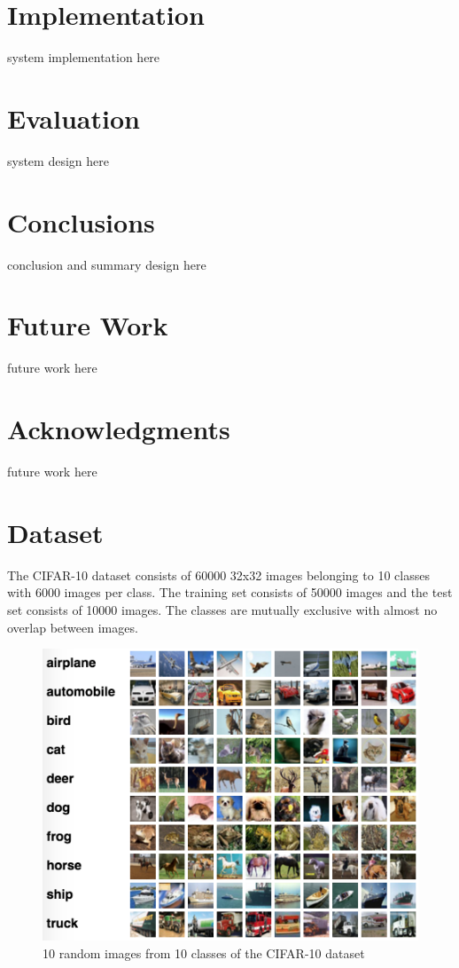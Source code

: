 \documentclass[10pt,twocolumn,letterpaper]{article}
\begin{document}
\section{Implementation} \label{implementation}
system implementation here

\section{Evaluation} \label{evaluation}
system design here

\section{Conclusions} \label{conclusions}
conclusion and summary design here

\section{Future Work} \label{futurework}
future work here

\section{Acknowledgments} \label{acknowledgments}
future work here

\section{Dataset}
The CIFAR-10 dataset \cite{krizhevsky2009learning} consists of 60000 32x32 images belonging to 10 classes with 6000 images per class.	The training set consists of 50000 images and the test set consists of 10000 images. The classes are mutually exclusive with almost no overlap between images.

\begin{figure}[hbt]
  \includegraphics[scale=0.50]{cifar-dataset}
  \caption{10 random images from 10 classes of the CIFAR-10 dataset}
\end{figure}
\end{document}
